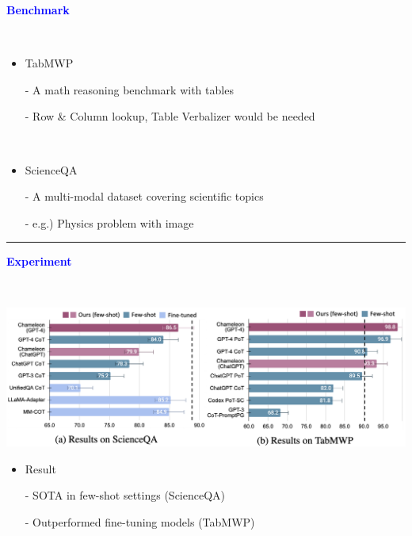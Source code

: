 \documentclass[professionalfont]{beamer}
\begin{document}
\begin{frame}
\begin{refsection}

\begin{center}
    { \textbf{\textcolor{blue}{ {\fontsize{12}{14}\selectfont Benchmark} }} }
\end{center}
\\[0.5cm]

{\fontsize{10}{14}\selectfont 
\begin{itemize}
    \item TabMWP \cite{TabMWP}

    - A math reasoning benchmark with tables

    - Row \& Column lookup, Table Verbalizer would be needed

    \\[0.5cm]
    
    \item ScienceQA \cite{ScienceQA}

    - A multi-modal dataset covering scientific topics

    - e.g.) Physics problem with image

\end{itemize}
}

\vspace{0.5cm}
\hrule
\printbibliography

\end{refsection}
\end{frame}

\begin{frame}

\begin{center}
    { \textbf{\textcolor{blue}{ {\fontsize{12}{14}\selectfont Experiment} }} }
\end{center}
\\[0.3cm]

\begin{center}
    \includegraphics[width=1.0\textwidth]{figure/3.png}
\end{center}


{\fontsize{10}{14}\selectfont 
\begin{itemize}
    \item Result
    
    - SOTA in few-shot settings (ScienceQA)

    - Outperformed fine-tuning models (TabMWP)
\end{itemize}
}

\end{frame}
\end{document}
